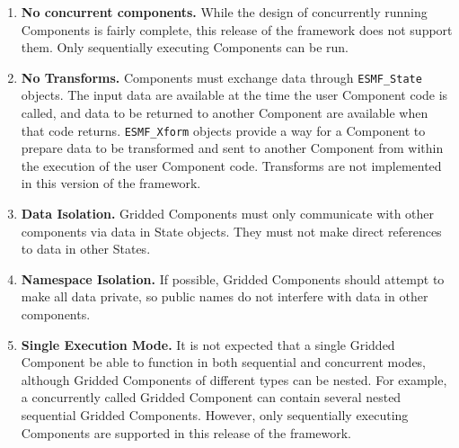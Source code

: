 %


\begin{enumerate}

\item {\bf No concurrent components.}  While the design of concurrently 
running Components is fairly complete, this release of the framework does 
not support them.  Only sequentially executing Components can be run.

\item {\bf No Transforms.}  Components must exchange data through   
{\tt ESMF\_State} objects.  The input data are available at the time 
the user Component code is called, and data to be returned to another 
Component are available when that code returns.  
{\tt ESMF\_Xform} objects provide a way for
a Component to prepare data to be transformed and 
sent to another Component from within the execution of 
the user Component code.
Transforms are not implemented in this version of the framework.

\item {\bf Data Isolation.} 
Gridded Components must only communicate with other
components via data in State objects.  They must 
not make direct references to data in other States.

\item {\bf Namespace Isolation.}
If possible, Gridded Components should attempt to make 
all data private, so public names do not interfere with data 
in other components.

\item {\bf Single Execution Mode.}
It is not expected that a single Gridded Component be able 
to function in both sequential and concurrent modes, although 
Gridded Components of different types can be nested. For example,
a concurrently called Gridded Component can contain several nested 
sequential Gridded Components.   However, only sequentially executing
Components are supported in this release of the framework.

\end{enumerate}
